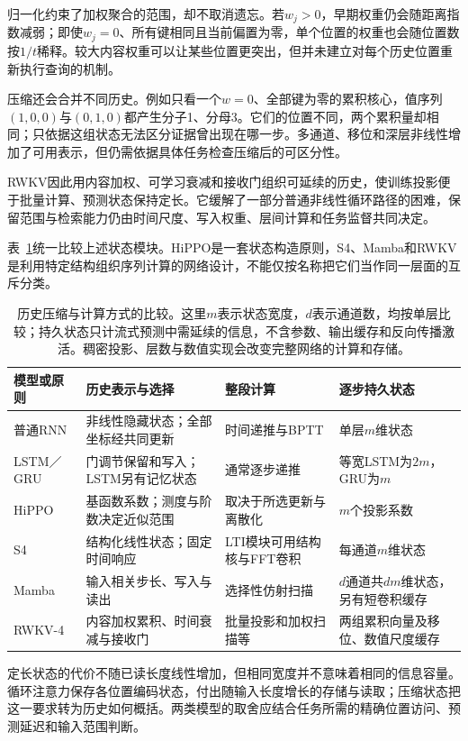归一化约束了加权聚合的范围，却不取消遗忘。若$w_j>0$，早期权重仍会随距离指数减弱；即使$w_j=0$、所有键相同且当前偏置为零，单个位置的权重也会随位置数按$1/t$稀释。较大内容权重可以让某些位置更突出，但并未建立对每个历史位置重新执行查询的机制。

压缩还会合并不同历史。例如只看一个$w=0$、全部键为零的累积核心，值序列$(1,0,0)$与$(0,1,0)$都产生分子1、分母3。它们的位置不同，两个累积量却相同；只依据这组状态无法区分证据曾出现在哪一步。多通道、移位和深层非线性增加了可用表示，但仍需依据具体任务检查压缩后的可区分性。

RWKV因此用内容加权、可学习衰减和接收门组织可延续的历史，使训练投影便于批量计算、预测状态保持定长。它缓解了一部分普通非线性循环路径的困难，保留范围与检索能力仍由时间尺度、写入权重、层间计算和任务监督共同决定。

表~\ref{tab:rnn-state-models}统一比较上述状态模块。HiPPO是一套状态构造原则，S4、Mamba和RWKV是利用特定结构组织序列计算的网络设计，不能仅按名称把它们当作同一层面的互斥分类。

\begin{table}[htb]
  \small
  \begin{tabularx}{\linewidth}{@{}p{19mm}XXX@{}}
    \toprule
    模型或原则 & 历史表示与选择 & 整段计算 & 逐步持久状态 \\
    \midrule
    普通RNN & 非线性隐藏状态；全部坐标经共同更新 & 时间递推与BPTT & 单层$m$维状态 \\
    LSTM／GRU & 门调节保留和写入；LSTM另有记忆状态 & 通常逐步递推 & 等宽LSTM为$2m$，GRU为$m$ \\
    HiPPO & 基函数系数；测度与阶数决定近似范围 & 取决于所选更新与离散化 & $m$个投影系数 \\
    S4 & 结构化线性状态；固定时间响应 & LTI模块可用结构核与FFT卷积 & 每通道$m$维状态 \\
    Mamba & 输入相关步长、写入与读出 & 选择性仿射扫描 & $d$通道共$dm$维状态，另有短卷积缓存 \\
    RWKV-4 & 内容加权累积、时间衰减与接收门 & 批量投影和加权扫描等 & 两组累积向量及移位、数值尺度缓存 \\
    \bottomrule
  \end{tabularx}
  \caption{历史压缩与计算方式的比较。这里$m$表示状态宽度，$d$表示通道数，均按单层比较；持久状态只计流式预测中需延续的信息，不含参数、输出缓存和反向传播激活。稠密投影、层数与数值实现会改变完整网络的计算和存储。}
  \label{tab:rnn-state-models}
\end{table}

定长状态的代价不随已读长度线性增加，但相同宽度并不意味着相同的信息容量。循环注意力保存各位置编码状态，付出随输入长度增长的存储与读取；压缩状态把这一要求转为历史如何概括。两类模型的取舍应结合任务所需的精确位置访问、预测延迟和输入范围判断。

